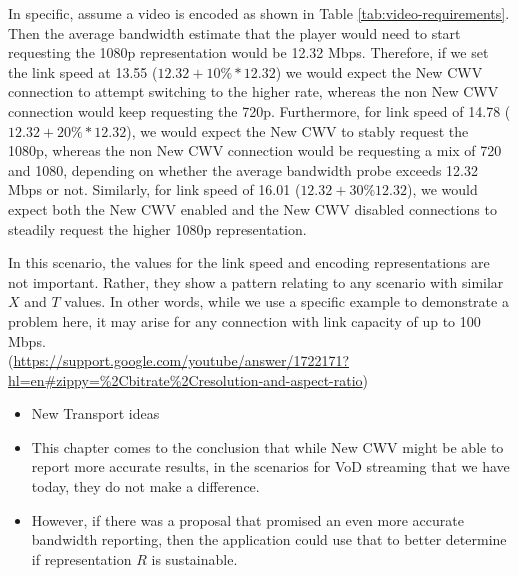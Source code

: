 \documentclass[10pt,sigconf]{acmart}
\begin{document}
In specific, assume a video is encoded as shown in Table \ref{tab:video-requirements}. Then the average bandwidth estimate that the player would need to start requesting the 1080p representation would be 12.32 Mbps. Therefore, if we set the link speed at 13.55 ($12.32 + 10\% * 12.32$) we would expect the New CWV connection to attempt switching to the higher rate, whereas the non New CWV connection would keep requesting the 720p. Furthermore, for link speed of 14.78 ($12.32 + 20\%*12.32$), we would expect the New CWV to stably request the 1080p, whereas the non New CWV connection would be requesting a mix of 720 and 1080, depending on whether the average bandwidth probe exceeds 12.32 Mbps or not. Similarly, for link speed of 16.01 ($12.32 + 30\% 12.32$), we would expect both the New CWV enabled and the New CWV disabled connections to steadily request the higher 1080p representation. 

In this scenario, the values for the link speed and encoding representations are not important. Rather, they show a pattern relating to any scenario with similar $X$ and $T$ values. In other words, while we use a specific example to demonstrate a problem here, it may arise for any connection with link capacity of up to 100 Mbps. \\(\url{https://support.google.com/youtube/answer/1722171?hl=en#zippy=%2Cbitrate%2Cresolution-and-aspect-ratio})

\begin{itemize}
    \item New Transport ideas
    \item This chapter comes to the conclusion that while New CWV might be able to report more accurate results, in the scenarios for VoD streaming that we have today, they do not make a difference.
    \item However, if there was a proposal that promised an even more accurate bandwidth reporting, then the application could use that to better determine if representation $R$ is sustainable.
\end{itemize}


\end{document}
